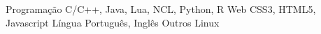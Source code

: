 

\begin{cvskills}
  \cvskill
    {Programação} %
    {C/C++, Java, Lua, NCL, Python, R} %
  \cvskill
    {Web} %
    {CSS3, HTML5, Javascript} %
  \cvskill
    {Língua} %
    {Português, Inglês} %
  \cvskill
    {Outros} %
    {Linux} %
\end{cvskills}
